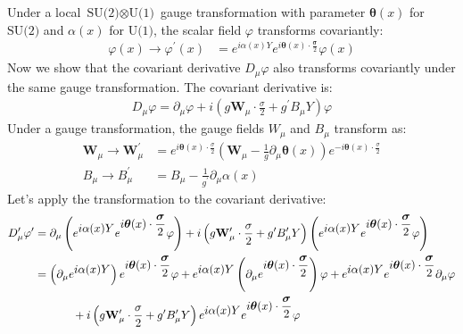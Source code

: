 \begin{enumerate}
Under a local $\text{SU(2)} \otimes \text{U(1)}$ gauge transformation with parameter $\boldsymbol{\theta}(x)$ for $\text{SU(2)}$ and $\alpha(x)$ for $\text{U(1)}$, the scalar field $\varphi$ transforms covariantly:
\begin{align}
    \varphi(x) \to \varphi^\prime (x) &= e^{\displaystyle i \alpha(x) Y} e^{\displaystyle i \boldsymbol{\theta}(x) \cdot \frac{\boldsymbol{\sigma}}{2}} \varphi(x)
\end{align}
Now we show that the covariant derivative $D_\mu \varphi$ also transforms covariantly under the same gauge transformation. The covariant derivative is:
\begin{align}
    D_\mu \varphi = \partial_\mu \varphi + i \left( g \mathbf{W}_\mu \cdot \frac{\sigma}{2} + g^\prime B_\mu Y \right) \varphi\label{eq:covariant-derivative-def}
\end{align}
Under a gauge transformation, the gauge fields $W_\mu$ and $B_\mu$ transform as:
\begin{align}
    \mathbf{W}_\mu \to \mathbf{W}_\mu^\prime &= e^{\displaystyle i \boldsymbol{\theta}(x) \cdot \frac{\sigma}{2}} \left( \mathbf{W}_\mu - \frac{1}{g} \partial_\mu \boldsymbol{\theta}(x) \right) e^{\displaystyle -i \boldsymbol{\theta}(x) \cdot \frac{\sigma}{2}} \\
    B_\mu \to B_\mu^\prime &= B_\mu - \frac{1}{g^\prime } \partial_\mu \alpha(x)
\end{align}
Let’s apply the transformation to the covariant derivative:
\begin{align*}
    D_\mu^\prime \varphi^\prime &= \partial_\mu \left( e^{\displaystyle i \alpha(x) Y} e^{\displaystyle i \boldsymbol{\theta}(x) \cdot \frac{\boldsymbol{\sigma}}{2}} \varphi \right) + i \left( g \mathbf{W}_\mu^\prime \cdot \frac{\sigma}{2} + g^\prime B_\mu^\prime Y \right) \left( e^{\displaystyle i \alpha(x) Y} e^{\displaystyle i \boldsymbol{\theta}(x) \cdot \frac{\boldsymbol{\sigma}}{2}} \varphi \right)\notag\\
    &= \left( \partial_\mu e^{\displaystyle i \alpha(x) Y} \right) e^{\displaystyle i \boldsymbol{\theta}(x) \cdot \frac{\boldsymbol{\sigma}}{2}} \varphi + e^{\displaystyle i \alpha(x) Y} \left( \partial_\mu e^{\displaystyle i \boldsymbol{\theta}(x) \cdot \frac{\boldsymbol{\sigma}}{2}} \right) \varphi + e^{\displaystyle i \alpha(x) Y} e^{\displaystyle i \boldsymbol{\theta}(x) \cdot \frac{\boldsymbol{\sigma}}{2}} \partial_\mu \varphi\notag\\
    &\qquad~~~~+ i \left( g \mathbf{W}_\mu^\prime \cdot \frac{\sigma}{2} + g^\prime B_\mu^\prime Y \right) e^{\displaystyle i \alpha(x) Y} e^{\displaystyle i \boldsymbol{\theta}(x) \cdot \frac{\boldsymbol{\sigma}}{2}} \varphi

\end{align*}
\end{enumerate}
